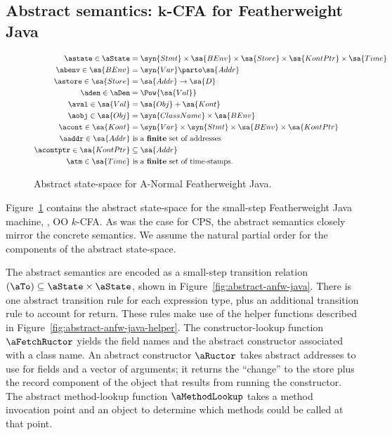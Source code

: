 \subsection{Abstract semantics: $\boldsymbol k$-CFA for Featherweight Java}





\begin{figure}
\begin{small}
\begin{small}\begin{align*}
  \astate \in \aState &= 
  \syn{Stmt} \times 
  \sa{BEnv} \times 
  \sa{Store} \times
  \sa{KontPtr} \times
  \sa{Time}  
\\
  \abenv \in \sa{BEnv} &= \syn{Var} \parto \sa{Addr} 
  \\
  \astore \in \sa{Store} &= \sa{Addr} \to \sa{D}
  \\
  \aden \in \aDen &= \Pow{\sa{Val}}
  \\
  \aval \in \sa{Val} &= \sa{Obj} + \sa{Kont}
  \\
  \aobj \in \sa{Obj} &= \syn{ClassName} \times \sa{BEnv}
  \\
  \acont \in \sa{Kont} &= 
   \syn{Var} \times \syn{Stmt} \times \sa{BEnv} \times \sa{KontPtr}
  \\
  \aaddr \in \sa{Addr} &\text{ is a \textbf{finite} set of addresses}
  \\
  \acontptr \in \sa{KontPtr} &\subseteq \sa{Addr}
  \\
  \atm \in \sa{Time} &\text{ is a \textbf{finite} set of time-stamps}  
  \text.  
\end{align*}\end{small}\end{small}\caption{Abstract state-space for A-Normal Featherweight Java.}
\label{fig:java-abstract-state-space}
\end{figure}


Figure~\ref{fig:java-abstract-state-space} contains the abstract
state-space for the small-step Featherweight Java machine, \ie, OO
$k$-CFA.
As was the case for CPS, the abstract semantics closely mirror the
concrete semantics.
We assume the natural partial order for the components of the abstract
state-space.


The abstract semantics are encoded as a small-step transition relation
$(\aTo) \subseteq \aState \times \aState$, shown in
Figure~\ref{fig:abstract-anfw-java}.
There is one abstract transition rule for each expression type, plus
an additional transition rule to account for return.
These rules make use of the helper functions described in
Figure~\ref{fig:abstract-anfw-java-helper}. 
The constructor-lookup function $\aFetchRuctor$ yields the field names
and the abstract constructor associated with a class name.
An abstract constructor $\aRuctor$ takes abstract addresses to use for
fields and a vector of arguments; it returns the ``change'' to the
store plus the record component of the object that results from
running the constructor.
The abstract method-lookup function $\aMethodLookup$ takes a method
invocation point and an object to determine which methods could be
called at that point.


